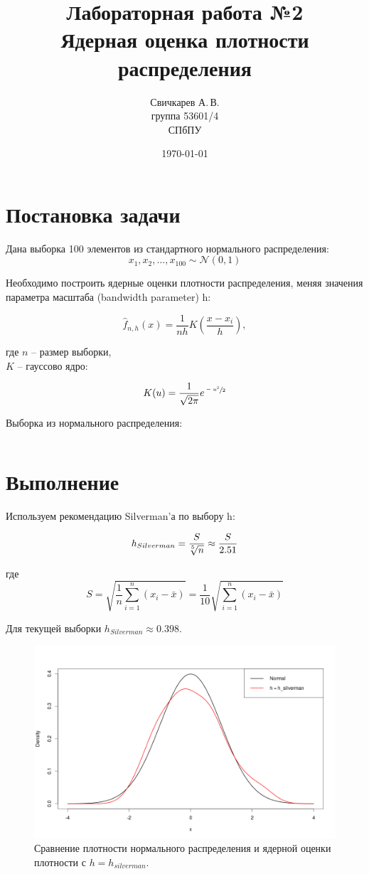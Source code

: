 \documentclass{article} %
\title{Лабораторная работа №2\\Ядерная оценка плотности распределения} %
\author{Свичкарев А.\,В.\\группа 53601/4\\СПбПУ} %
\date{\today} %
\begin{document}

\maketitle %

\section{Постановка задачи}
Дана выборка 100 элементов из стандартного нормального \mbox{распределения}:
\[x_1,x_2,\dotsc,x_{100}\sim\mathcal{N}(0,1)\]

Необходимо построить ядерные оценки плотности распределения, меняя значения параметра масштаба (bandwidth parameter) h:

\[\hat{f}_{n,h}(x) = \frac{1}{nh}K{\left(\frac{x-x_i}{h}\right)},\]

где $n$ -- размер выборки,\\
\indent $K$ -- гауссово ядро:

\[K(u) = \frac{1}{\sqrt{2\pi}}e^{\sfrac{-u^2}{2}}\]

Выборка из нормального распределения:
\\\newline
\begin{Verbatim}

\end{Verbatim}

\newpage
\section{Выполнение}
Используем рекомендацию Silverman'а по выбору h:

\[h_{Silverman} = \frac{S}{\sqrt[\leftroot{2}\uproot{2}5]{n}} \approx \frac{S}{2.51}\]

где \[S = \sqrt{\frac{1}{n}\sum_{i=1}^{n} (x_i-\bar{x})} = \frac{1}{10}\sqrt{\sum_{i=1}^{n}(x_i-\bar{x})}\]

Для текущей выборки $h_{Silverman} \approx 0.398$.

\begin{figure}[H]
    \captionsetup{justification=centering}
    \includegraphics[width=\textwidth]{plot1}
    \caption{Сравнение плотности нормального распределения и ядерной оценки плотности с $h = h_{silverman}$.}
\end{figure}
\end{document}
